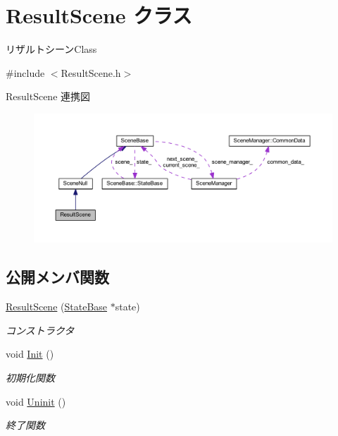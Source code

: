 \hypertarget{class_result_scene}{}\section{Result\+Scene クラス}
\label{class_result_scene}


リザルトシーン\+Class  




{\ttfamily \#include $<$Result\+Scene.\+h$>$}



Result\+Scene 連携図\nopagebreak
\begin{figure}[H]
\begin{center}
\leavevmode
\includegraphics[width=350pt]{class_result_scene__coll__graph}
\end{center}
\end{figure}
\subsection*{公開メンバ関数}
\begin{DoxyCompactItemize}
\item 
\mbox{\hyperlink{class_result_scene_ac184d41a92125eda200a132fe7aadd2e}{Result\+Scene}} (\mbox{\hyperlink{class_scene_base_1_1_state_base}{State\+Base}} $\ast$state)
\begin{DoxyCompactList}\small\item\em コンストラクタ \end{DoxyCompactList}\item 
void \mbox{\hyperlink{class_result_scene_a222b1c39e96888c43ae2111726576768}{Init}} ()
\begin{DoxyCompactList}\small\item\em 初期化関数 \end{DoxyCompactList}\item 
void \mbox{\hyperlink{class_result_scene_a17c396c63a5575a545cd771ece012140}{Uninit}} ()
\begin{DoxyCompactList}\small\item\em 終了関数 \end{DoxyCompactList}\end{DoxyCompactItemize}
